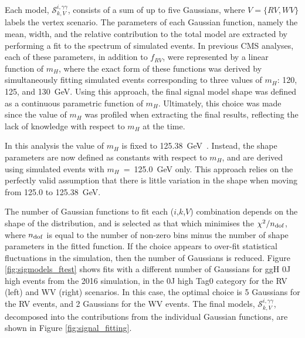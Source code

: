 Each model, $\mathcal{S}^{i,\gamma\gamma}_{k,V}$, consists of a sum of up to five Gaussians, where $V=\{RV,WV\}$ labels the vertex scenario. The parameters of each Gaussian function, namely the mean, width, and the relative contribution to the total model are extracted by performing a fit to the \mgg spectrum of simulated events. In previous CMS \Hgg analyses, each of these parameters, in addition to $f_{RV}$, were represented by a linear function of $m_H$, where the exact form of these functions was derived by simultaneously fitting simulated events corresponding to three values of $m_H$: 120, 125, and 130~GeV. Using this approach, the final signal model shape was defined as a continuous parametric function of $m_H$. Ultimately, this choice was made since the value of $m_H$ was profiled when extracting the final results, reflecting the lack of knowledge with respect to $m_H$ at the time. 

In this analysis the value of $m_H$ is fixed to 125.38~GeV~\cite{Sirunyan:2020xwk}. Instead, the shape parameters are now defined as constants with respect to $m_H$, and are derived using simulated events with $m_H$~=~125.0~GeV only. This approach relies on the perfectly valid assumption that there is little variation in the shape when moving from 125.0 to 125.38~GeV. 

The number of Gaussian functions to fit each ($i$,$k$,$V$) combination depends on the shape of the \mgg distribution, and is selected as that which minimises the $\chi^2/n_{\rm{dof}}$, where $n_{\rm{dof}}$ is equal to the number of non-zero \mgg bins minus the number of shape parameters in the fitted function. If the choice appears to over-fit statistical fluctuations in the simulation, then the number of Gaussians is reduced. Figure \ref{fig:sigmodels_ftest} shows fits with a different number of Gaussians for ggH 0J high \ptH events from the 2016 simulation, in the 0J high \ptgg Tag0 category for the RV (left) and WV (right) scenarios. In this case, the optimal choice is 5 Gaussians for the RV events, and 2 Gaussians for the WV events. The final models, $\mathcal{S}^{i,\gamma\gamma}_{k,V}$, decomposed into the contributions from the individual Gaussian functions, are shown in Figure \ref{fig:signal_fitting}. 

